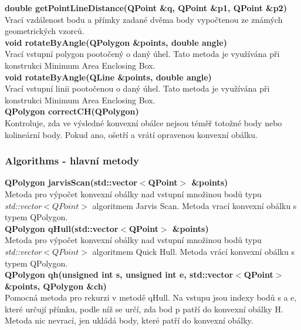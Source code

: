\documentclass[a4paper,11pt,twoside]{article}
\begin{document}
\noindent\textbf{double getPointLineDistance(QPoint \&q, QPoint \&p1, QPoint \&p2)}\\
Vrací vzdálenost bodu a přímky zadané dvěma body vypočtenou ze známých geometrických vzorců.\\

\noindent\textbf{void rotateByAngle(QPolygon \&points, double angle)}\\
Vrací vstupní polygon pootočený o daný úhel. Tato metoda je využívána při konstrukci Minimum Area Enclosing Box.\\

\noindent\textbf{void rotateByAngle(QLine \&points, double angle)}\\
Vrací vstupní linii pootočenou o daný úhel. Tato metoda je využívána při konstrukci Minimum Area Enclosing Box.\\

\noindent\textbf{QPolygon correctCH(QPolygon)}\\
Kontroluje, zda ve výsledné konvexní obálce nejsou téměř totožné body nebo kolineární body. Pokud ano, ošetří a vrátí opravenou konvexní obálku.

\subsubsection{Algorithms - hlavní metody}

\noindent\textbf{QPolygon jarvisScan(std::vector$<$QPoint$>$ \&points)}\\
Metoda pro výpočet konvexní obálky nad vstupní množinou bodů typu \textit{std::vector$<QPoint>$} algoritmem Jarvis Scan. Metoda vrací konvexní obálku s typem QPolygon.
\\

\noindent\textbf{QPolygon qHull(std::vector$<$QPoint$>$ \&points)}\\
Metoda pro výpočet konvexní obálky nad vstupní množinou bodů typu \textit{std::vector$<QPoint>$} algoritmem Quick Hull. Metoda vrácí konvexní obálku s typem QPolygon.
\\

\noindent\textbf{QPolygon qh(unsigned int s, unsigned int e, std::vector$<$QPoint$>$ \&points, QPolygon \&ch)}\\
Pomocná metoda pro rekurzi v metodě qHull. Na vstupu jsou indexy bodů s a e, které určují přímku, podle níž se určí, zda bod p patří do konvexní obálky H. Metoda nic nevrací, jen ukládá body, které patří do konvexní obálky.
\\
\end{document}
